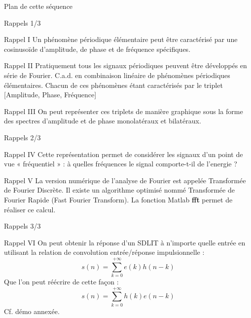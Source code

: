 \documentclass[a4paper,11pt]{beamer}
\begin{document}
\begin{frame}{Plan de cette séquence}
	\tableofcontents[hideallsubsections]
\end{frame}


\begin{frame}{Rappels 1/3}
\begin{alertblock}{Rappel I}
\justifying
Un phénomène périodique élémentaire peut être caractérisé par une cosinusoïde
d'amplitude, de phase et de fréquence spécifiques.
\end{alertblock}
\pause
\begin{alertblock}{Rappel II}
\justifying
Pratiquement tous les signaux périodiques peuvent être développés en série de
Fourier. C.a.d. en combinaison linéaire de phénomènes périodiques élémentaires.
Chacun de ces phénomènes étant caractérisés par le triplet [Amplitude, Phase,
Fréquence]
\end{alertblock}
\pause
\begin{alertblock}{Rappel III}
\justifying
On peut représenter ces triplets de manière graphique sous la forme des spectres
d'amplitude et de phase monolatéraux et bilatéraux.
\end{alertblock}
\end{frame}

\begin{frame}{Rappels 2/3}
\begin{alertblock}{Rappel IV}
\justifying
Cette représentation permet de considérer les signaux d'un point de vue
« fréquentiel » : à quelles fréquences le signal comporte-t-il de l'energie ?
\end{alertblock}
\pause
\begin{alertblock}{Rappel V}
\justifying
La version numérique de l'analyse de Fourier est appelée Transformée de
Fourier Discrète. Il existe un algorithme optimisé nommé Transformée de
Fourier Rapide (Fast Fourier Transform). La fonction Matlab \textbf{fft} permet
de réaliser ce calcul.
\end{alertblock}
\end{frame}

\begin{frame}{Rappels 3/3}
\begin{alertblock}{Rappel VI}
\justifying
On peut obtenir la réponse d'un SDLIT à n'importe quelle entrée en utilisant la
relation de convolution entrée/réponse impulsionnelle :
$$
s(n) = \sum_{k=0}^{+\infty} e(k)h(n-k)
$$
Que l'on peut réécrire de cette façon :
$$
s(n) = \sum_{k=0}^{+\infty} h(k)e(n-k)
$$
Cf. démo annexée.
\end{alertblock}
\end{frame}
\end{document}
